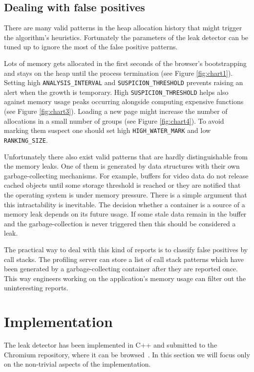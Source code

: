 \documentclass[preprint, numbers]{sigplanconf}
\begin{document}
\subsection{Dealing with false positives}
\label{sec:false}

There are many valid patterns in the heap allocation history that might trigger the algorithm's
heuristics.
Fortunately the parameters of the leak detector can be tuned up to ignore the most of
the false positive patterns.

Lots of memory gets allocated in the first seconds of the browser's bootstrapping
and stays on the heap until the process termination (see Figure \ref{fig:chart1}).
Setting high \texttt{ANALYSIS\_INTERVAL} and \texttt{SUSPICION\_THRESHOLD}
prevents raising an alert when the growth is temporary.
High \texttt{SUSPICION\_THRESHOLD} helps also against memory usage peaks
occurring alongside computing expensive functions (see Figure \ref{fig:chart3}).
Loading a new page might increase the number of allocations in a small
number of groups (see Figure \ref{fig:chart4}).
To avoid marking them suspect one should set high \texttt{HIGH\_WATER\_MARK}
and low \texttt{RANKING\_SIZE}.

Unfortunately there also exist valid patterns that are hardly distinguishable from
the memory leaks.
One of them is generated by data structures with their own garbage-collecting mechanisms.
For example, buffers for video data do not release cached objects until some storage threshold
is reached or they are notified that the operating system is under memory pressure.
There is a simple argument that this intractability is inevitable.
The decision whether a container is a source of a memory leak
depends on its future usage.
If some stale data remain in the buffer and the garbage-collection is never triggered
then this should be considered a leak.

The practical way to deal with this kind of reports is to
classify false positives by call stacks.
The profiling server can store a list of call stack patterns
which have been generated by a garbage-collecting container
after they are reported once.
This way engineers working on the application's memory usage
can filter out the uninteresting reports.

\section{Implementation}
The leak detector has been implemented in C++ and submitted to the Chromium repository, where
it can be browsed~\cite{chromium-leak}.
In this section we will focus only on the non-trivial aspects of the implementation.
\end{document}
